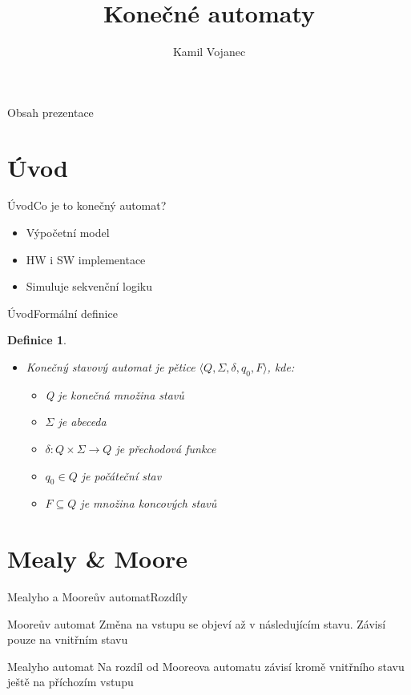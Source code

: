 \documentclass{beamer}
\title{Konečné automaty}
\author{Kamil Vojanec}
\institute[Vysoké učení technické] 
{Fakulta informačních technologií \\ Vysoké učení technické v Brně}
\newtheorem{def1}{Definice}
\begin{document}
\begin{frame}
  \titlepage
\end{frame}

\begin{frame}{Obsah prezentace}
  \tableofcontents
\end{frame}


\section{Úvod}


\begin{frame}{Úvod}{Co je to konečný automat?}
  \begin{itemize}
  \item {Výpočetní model}
  \item {HW i SW implementace}
  \item {Simuluje sekvenční logiku}
  \end{itemize}
\end{frame}


\begin{frame}{Úvod}{Formální definice}
    \begin{def1}
        \begin{itemize}
            \item {Konečný stavový automat je pětice $\langle Q, \Sigma, \delta, q_0, F \rangle$, kde:}
            \begin{itemize}
                \item Q \textup{je} konečná množina stavů
                \item $\Sigma$ \textup{je} abeceda
                \item $\delta : Q \times \Sigma \rightarrow Q$ \textup{je} přechodová funkce
                \item $q_0 \in Q$ \textup{je} počáteční stav
                \item $F \subseteq Q$ \textup{je} množina koncových stavů
            \end{itemize}
  
        \end{itemize}
    \end{def1}
\end{frame}



\section{Mealy \& Moore}
\begin{frame}{Mealyho a Mooreův automat}{Rozdíly}
    \begin{block}{Mooreův automat}
        Změna na vstupu se objeví až v následujícím stavu. Závisí pouze na vnitřním stavu
    \end{block}
    \begin{block}{Mealyho automat}
        Na rozdíl od Mooreova automatu závisí kromě vnitřního stavu ještě na příchozím vstupu
    \end{block}

\end{frame}
\end{document}
